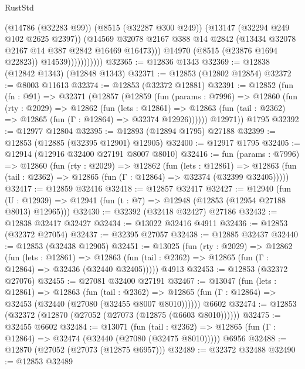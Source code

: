 \begin{lexlean}{RustStd}
\begin{coremodule}
                            (@14786 (@32283 @99))
                            (@8515 (@32287 @300 @249))
                            (@13147 (@32294 @249 @102 @2625 @2397))
                            (@14569
                              @32078
                              @2167
                              @388
                              @14
                              @2842
                              (@13434 @32078 @2167 @14 @387 @2842 @16469 @16473)))
                          @14970
                          (@8515 (@23876 @1694 @22823))
                          @14539)))))))))))
@32365 := @12836 @1343
@32369 := @12838 (@12842 @1343) (@12848 @1343)
@32371 := @12853 (@12802 @12854)
@32372 := @8003 @11613
@32374 := @12853 (@32372 @12881)
@32391 := @12852
    (fun (fn : @91) =>
    @32371
      (@12857
        (@12859
          (fun (params : @7996) =>
          @12860
            (fun (rty : @2029) =>
            @12862
              (fun (lets : @12861) =>
              @12863 (fun (tail : @2362) => @12865 (fun (Γ : @12864) => @32374 @12926))))))
        @12971))
    @1795
@32392 := @12977 @12804
@32395 := @12893 (@12894 @1795) @27188
@32399 := @12853 (@12885 (@32395 @12901) @12905)
@32400 := @12917 @1795
@32405 := @12914 (@12916 @32400 @27191 @8007 @8010)
@32416 := fun (params : @7996) =>
  @12860
    (fun (rty : @2029) =>
    @12862
      (fun (lets : @12861) =>
      @12863 (fun (tail : @2362) => @12865 (fun (Γ : @12864) => @32374 (@32399 @32405)))))
@32417 := @12859 @32416
@32418 := @12857 @32417
@32427 := @12940
    (fun (U : @12939) => @12941 (fun (t : @7) => @12948 (@12853 (@12954 @27188 @8013) @12965)))
@32430 := @32392 (@32418 @32427) @27186
@32432 := @12838 @32417 @32427
@32434 := @13022 @32416 @4911
@32436 := @12853 (@32372 @27054)
@32437 := @32395 @27057
@32438 := @12885 @32437
@32440 := @12853 (@32438 @12905)
@32451 := @13025
    (fun (rty : @2029) =>
    @12862
      (fun (lets : @12861) =>
      @12863 (fun (tail : @2362) => @12865 (fun (Γ : @12864) => @32436 (@32440 @32405)))))
    @4913
@32453 := @12853 (@32372 @27076)
@32455 := @27081 @32400 @27191
@32467 := @13047
    (fun (lets : @12861) =>
    @12863
      (fun (tail : @2362) =>
      @12865 (fun (Γ : @12864) => @32453 (@32440 (@27080 (@32455 @8007 @8010))))))
    @6602
@32474 := @12853 (@32372 (@12870 (@27052 (@27073 (@12875 (@6603 @8010))))))
@32475 := @32455 @6602
@32484 := @13071
    (fun (tail : @2362) => @12865 (fun (Γ : @12864) => @32474 (@32440 (@27080 (@32475 @8010)))))
    @6956
@32488 := @12870 (@27052 (@27073 (@12875 @6957)))
@32489 := @32372 @32488
@32490 := @12853 @32489

\end{coremodule}
\end{lexlean}
